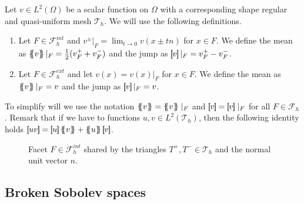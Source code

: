     Let $v\in L^2( \Omega ) $ be a scalar function on $\Omega$ with a corresponding shape regular and quasi-uniform mesh $\mathcal{T}_{h} $. We will use the following definitions.
    \begin{enumerate}[label=\arabic*)]
        \item Let $F \in \mathcal{F}^{int} _{h}$ and $v^{\pm}| _{F} = \lim_{t\to 0} v( x \pm tn)   $ for $x \in F$. We define the mean as $\left\{\!\!\left\{ v\right\}\!\!\right\} |_{F} = \frac{1}{2} (v^{+}_{F} + v^{-}_{F})   $ and the jump as $\left[\!\!\left[ v \right]\!\!\right]|_{F} =  v^{+}_{F} - v^{-}_{F} $.
        \item Let $F \in \mathcal{F}^{ext} _{h}$ and let $ v( x) =  v(x)|_{F} $ for  $x \in F$.
We define the mean as $\left\{\!\!\left\{ v\right\}\!\!\right\} |_{F} = v    $ and the jump as $\left[\!\!\left[ v \right]\!\!\right]|_{F} = v$.

    \end{enumerate}
    To simplify will we use the notation $\mean{ v } = \mean{ v } \mid _{F}    $ and $\jump{ v } = \jump{ v } \mid _{F}    $ for all $F \in \mathcal{F} _{h}$.
    Remark that if we have to functions $u,v \in L^2( \mathcal{T}_{h} ) $, then the following identity holds $  \jump{ uv }    = \jump{ u }   \mean{ v }    + \mean{ u }  \jump{ v }$.


\begin{figure}[!h]
\centering
{}

\caption{Facet $F \in \mathcal{F}_h^{int} $ shared by the triangles $T^{+}, T^{-} \in \mathcal{T}_{h} $ and the normal unit vector $n$.  }
    \label{fig:normal}
\end{figure}



\subsection{Broken Sobolev spaces}%
\label{sub:broken_sobolev_spaces}

